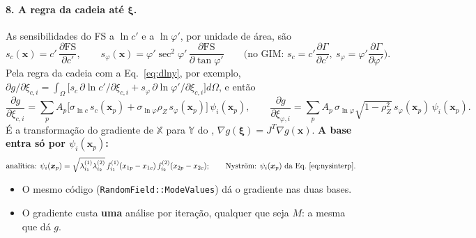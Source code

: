 \documentclass[11pt,a4paper]{article}
\newcommand{\X}{\mathbb{X}}
\newcommand{\Y}{\mathbb{Y}}
\newcommand{\xib}{\bm\xi}
\newcommand{\FS}{\mathrm{FS}}
\begin{document}
\paragraph{8. A regra da cadeia até $\xib$.} As sensibilidades do FS a $\ln c'$ e a $\ln\varphi'$, por unidade de área,
são
\begin{equation}
  s_c(\bm x) = c'\,\frac{\partial\FS}{\partial c'}, \qquad
  s_\varphi(\bm x) = \varphi'\sec^2\varphi'\,\frac{\partial\FS}{\partial\tan\varphi'}
  \qquad\Big(\text{no GIM: } s_c = c'\frac{\partial\Gamma}{\partial c'},\ s_\varphi = \varphi'\frac{\partial\Gamma}{\partial\varphi'}\Big).
  \label{eq:sens}
\end{equation}
Pela regra da cadeia com a Eq.~\eqref{eq:dlny}, por exemplo,
$\partial g/\partial \xi_{c,i} = \int_\Omega\big[s_c\,\partial\ln c'/\partial \xi_{c,i} + s_\varphi\,\partial\ln\varphi'/
\partial \xi_{c,i}\big]d\Omega$, e então
\begin{equation}
  \frac{\partial g}{\partial \xi_{c,i}} = \sum_p A_p\big[\sigma_{\ln c}\,s_c(\bm x_p) + \sigma_{\ln\varphi}\rho_Z\,s_\varphi(\bm x_p)\big]\,
  \psi_i(\bm x_p), \qquad
  \frac{\partial g}{\partial \xi_{\varphi,i}} = \sum_p A_p\,\sigma_{\ln\varphi}\sqrt{1 - \rho_Z^2}\,s_\varphi(\bm x_p)\,\psi_i(\bm x_p).
  \label{eq:gradmodal}
\end{equation}
É a transformação do gradiente de $\X$ para $\Y$ do \citet[Eq.~4.35]{beck2014}, $\nabla g(\xib) = J^T\nabla g(\bm x)$.
\textbf{A base entra só por $\psi_i(\bm x_p)$:}
\begin{equation}
  \text{analítica: } \psi_i(\bm x_p) = \sqrt{\lambda^{(1)}_{i_1}\lambda^{(2)}_{i_2}}\,f^{(1)}_{i_1}(x_{1p} - x_{1c})\,
  f^{(2)}_{i_2}(x_{2p} - x_{2c}); \qquad
  \text{Nyström: } \psi_i(\bm x_p) \text{ da Eq.~\eqref{eq:nysinterp}}.
  \label{eq:psibases}
\end{equation}
\begin{itemize}
  \item O mesmo código (\texttt{RandomField::ModeValues}) dá o gradiente nas duas bases.
  \item O gradiente custa \textbf{uma} análise por iteração, qualquer que seja $M$: a mesma que dá $g$.
\end{itemize}
\end{document}
